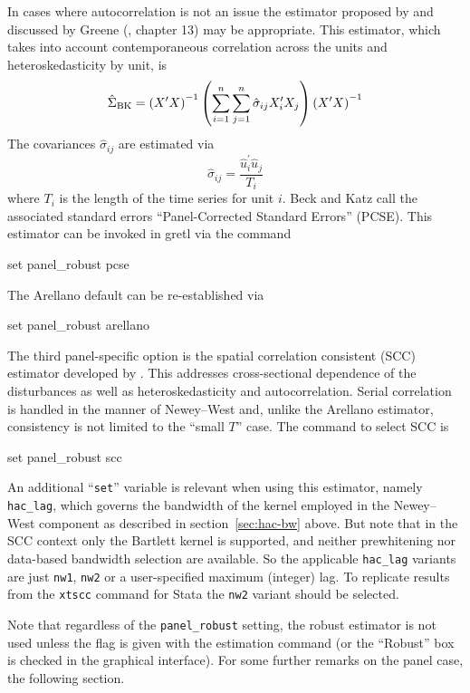 In cases where autocorrelation is not an issue the estimator proposed
by \cite{beck-katz95} and discussed by Greene (\citeyear{greene03},
chapter 13) may be appropriate.  This estimator, which takes into
account contemporaneous correlation across the units and
heteroskedasticity by unit, is
\[
\hat{\Sigma}_{\rm BK} = 
\left(X^{\prime}X\right)^{-1}
\left( \sum_{i=1}^n \sum_{j=1}^n \hat{\sigma}_{ij} X^{\prime}_iX_j \right)
\left(X^{\prime}X\right)^{-1}
\]
The covariances $\hat{\sigma}_{ij}$ are estimated via
\[
\hat{\sigma}_{ij} = \frac{\hat{u}^{\prime}_i \hat{u}_j}{T_i}
\]
where $T_i$ is the length of the time series for unit $i$.  Beck and
Katz call the associated standard errors ``Panel-Corrected Standard
Errors'' (PCSE).  This estimator can be invoked in gretl via the
command
%
\begin{code}
set panel_robust pcse
\end{code}
%
The Arellano default can be re-established via 
%
\begin{code}
set panel_robust arellano
\end{code}

The third panel-specific option is the spatial correlation consistent
(SCC) estimator developed by \cite{driscoll_kraay98}. This addresses
cross-sectional dependence of the disturbances as well as
heteroskedasticity and autocorrelation. Serial correlation is handled
in the manner of Newey--West and, unlike the Arellano estimator,
consistency is not limited to the ``small $T$'' case. The command to
select SCC is
\begin{code}
set panel_robust scc
\end{code}
An additional ``\texttt{set}'' variable is relevant when using this
estimator, namely \texttt{hac\_lag}, which governs the bandwidth of
the kernel employed in the Newey--West component as described in
section~\ref{sec:hac-bw} above. But note that in the SCC context only
the Bartlett kernel is supported, and neither prewhitening nor
data-based bandwidth selection are available.  So the applicable
\texttt{hac\_lag} variants are just \texttt{nw1}, \texttt{nw2} or a
user-specified maximum (integer) lag. To replicate results from the
\texttt{xtscc} command for \textsf{Stata} \citep{hoechle07} the
\texttt{nw2} variant should be selected.

Note that regardless of the \verb|panel_robust| setting, the robust
estimator is not used unless the  flag is given with
the estimation command (or the ``Robust'' box is checked in the
graphical interface). For some further remarks on the panel case, the
following section.

